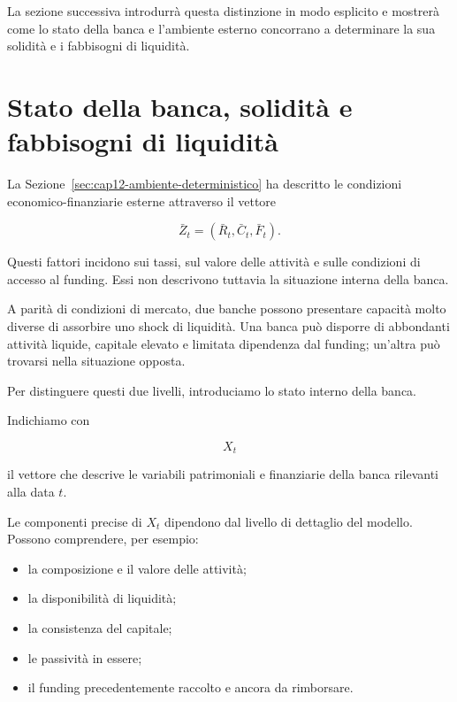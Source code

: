La sezione successiva introdurr\`a questa distinzione in modo esplicito e
mostrer\`a come lo stato della banca e l'ambiente esterno concorrano a
determinare la sua solidit\`a e i fabbisogni di liquidit\`a.

\section{Stato della banca, solidit\`a e fabbisogni di liquidit\`a}

\label{sec:cap12-stato-banca}

La Sezione~\ref{sec:cap12-ambiente-deterministico} ha descritto le condizioni
economico-finanziarie esterne attraverso il vettore

\[
\bar Z_t
=
(\bar R_t,\bar C_t,\bar F_t).
\]

Questi fattori incidono sui tassi, sul valore delle attivit\`a e sulle
condizioni di accesso al funding. Essi non descrivono tuttavia la situazione
interna della banca.

A parit\`a di condizioni di mercato, due banche possono presentare capacit\`a
molto diverse di assorbire uno shock di liquidit\`a. Una banca pu\`o disporre
di abbondanti attivit\`a liquide, capitale elevato e limitata dipendenza dal
funding; un'altra pu\`o trovarsi nella situazione opposta.

Per distinguere questi due livelli, introduciamo lo stato interno della banca.

\begin{definition}

Indichiamo con

\[
X_t
\]

\noindent il vettore che descrive le variabili patrimoniali e finanziarie della banca
rilevanti alla data $t$.

\end{definition}

Le componenti precise di $X_t$ dipendono dal livello di dettaglio del modello.
Possono comprendere, per esempio:

\begin{itemize}

\item la composizione e il valore delle attivit\`a;

\item la disponibilit\`a di liquidit\`a;

\item la consistenza del capitale;

\item le passivit\`a in essere;

\item il funding precedentemente raccolto e ancora da rimborsare.

\end{itemize}

